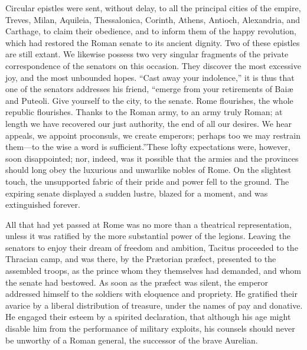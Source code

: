 
Circular epistles were sent, without delay, to all the principal
cities of the empire, Treves, Milan, Aquileia, Thessalonica,
Corinth, Athens, Antioch, Alexandria, and Carthage, to claim
their obedience, and to inform them of the happy revolution,
which had restored the Roman senate to its ancient dignity. Two
of these epistles are still extant. We likewise possess two very
singular fragments of the private correspondence of the senators
on this occasion. They discover the most excessive joy, and the
most unbounded hopes. “Cast away your indolence,” it is thus that
one of the senators addresses his friend, “emerge from your
retirements of Baiæ and Puteoli. Give yourself to the city, to
the senate. Rome flourishes, the whole republic flourishes.
Thanks to the Roman army, to an army truly Roman; at length we
have recovered our just authority, the end of all our desires. We
hear appeals, we appoint proconsuls, we create emperors; perhaps
too we may restrain them—to the wise a word is sufficient.”\footnotemark[15]
These lofty expectations were, however, soon disappointed; nor,
indeed, was it possible that the armies and the provinces should
long obey the luxurious and unwarlike nobles of Rome. On the
slightest touch, the unsupported fabric of their pride and power
fell to the ground. The expiring senate displayed a sudden
lustre, blazed for a moment, and was extinguished forever.


All that had yet passed at Rome was no more than a theatrical
representation, unless it was ratified by the more substantial
power of the legions. Leaving the senators to enjoy their dream
of freedom and ambition, Tacitus proceeded to the Thracian camp,
and was there, by the Prætorian præfect, presented to the
assembled troops, as the prince whom they themselves had
demanded, and whom the senate had bestowed. As soon as the
præfect was silent, the emperor addressed himself to the soldiers
with eloquence and propriety. He gratified their avarice by a
liberal distribution of treasure, under the names of pay and
donative. He engaged their esteem by a spirited declaration, that
although his age might disable him from the performance of
military exploits, his counsels should never be unworthy of a
Roman general, the successor of the brave Aurelian.\footnotemark[16]

